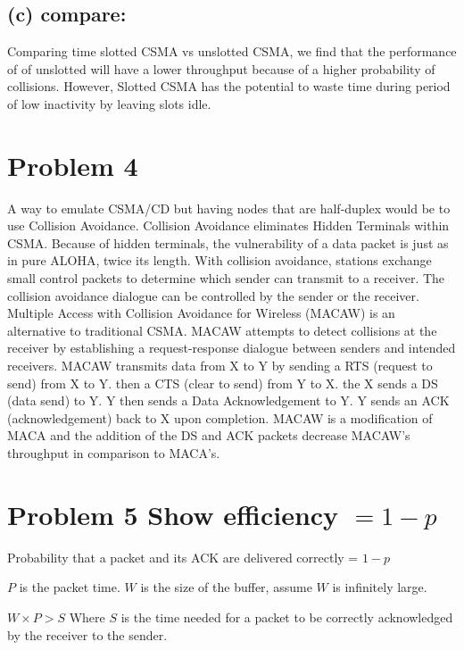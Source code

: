 \documentclass[12pt]{article}
\begin{document}
  \subsection*{(c) compare:}  Comparing time slotted CSMA vs unslotted CSMA, we find that the performance of of unslotted will have a lower throughput because of a higher probability of collisions.  However, Slotted CSMA has the potential to waste time during period of low inactivity by leaving slots idle.

    
    \section*{Problem 4 }   
    A way to emulate CSMA/CD but having nodes that are half-duplex would be to use Collision Avoidance.  Collision Avoidance eliminates Hidden Terminals within CSMA.  Because of hidden terminals, the vulnerability of a data packet is just as in pure ALOHA, twice its length.  With collision avoidance, stations exchange small control packets to determine which sender can transmit to a receiver. The collision avoidance dialogue can be controlled by the sender or the receiver.  Multiple Access with Collision Avoidance for Wireless (MACAW) is an alternative to traditional CSMA.  MACAW attempts to detect collisions at the receiver by establishing a request-response dialogue between senders and intended receivers.  MACAW transmits data from X to Y by sending a RTS (request to send) from X to Y.  then a CTS (clear to send) from Y to X.  the X sends a DS (data send) to Y.  Y then sends a Data Acknowledgement to Y.  Y sends an ACK (acknowledgement) back to X upon completion.  MACAW is a modification of MACA and the addition of the DS and ACK packets decrease MACAW's throughput in comparison to MACA's.  
    
    
    

   
    \section*{Problem 5 Show efficiency $= 1-p$ }   
    
    Probability that a packet and its ACK are delivered correctly = $1-p$
           
   $P$ is the packet time.  $W$ is the size of the buffer, assume $W$ is infinitely large.
   
   $W\times P > S $  Where $S$ is the time needed for a packet to be correctly acknowledged by the receiver to the sender.
   
\end{document}
